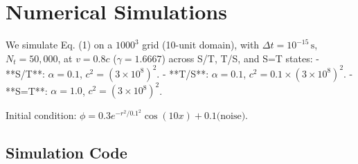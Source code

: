 \documentclass[11pt]{article}
\begin{document}
\section{Numerical Simulations}
We simulate Eq. (1) on a $1000^3$ grid (10-unit domain), with \(\Delta t = 10^{-15} \, \text{s}\), \(N_t = 50,000\), at \(v = 0.8c\) (\(\gamma = 1.6667\)) across S/T, T/S, and S=T states:
- **S/T**: \(\alpha = 0.1\), \(c^2 = (3 \times 10^8)^2\).
- **T/S**: \(\alpha = 0.1\), \(c^2 = 0.1 \times (3 \times 10^8)^2\).
- **S=T**: \(\alpha = 1.0\), \(c^2 = (3 \times 10^8)^2\).

Initial condition: \(\phi = 0.3 e^{-r^2/0.1^2} \cos(10x) + 0.1 \text{(noise)}\).

\subsection{Simulation Code}
\end{document}
